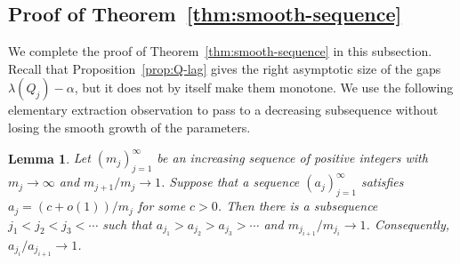 \documentclass[10pt]{article}
\numberwithin{equation}{section}
\newtheorem{lemma}[theorem]{Lemma}
\begin{document}
\subsection{Proof of Theorem~\ref{thm:smooth-sequence}}
%
We complete the proof of Theorem~\ref{thm:smooth-sequence} in this subsection. 
Recall that Proposition~\ref{prop:Q-lag} gives the right asymptotic size of the gaps $\lambda(Q_j)-\alpha$, but it does not by itself make them monotone. We use the following elementary extraction observation to pass to a decreasing subsequence without losing the smooth growth of the parameters.

\begin{lemma}\label{lem:extraction}
Let $(m_j)_{j=1}^\infty$ be an increasing sequence of positive integers with $m_j\to\infty$ and $m_{j+1}/m_j\to 1$. Suppose that a sequence $(a_j)_{j=1}^\infty$ satisfies $a_j=(c+o(1))/{m_j}$ for some $c>0$. Then there is a subsequence $j_1<j_2<j_3<\cdots$ such that $a_{j_1}>a_{j_2}>a_{j_3}>\cdots$ and ${m_{j_{i+1}}}/{m_{j_i}}\to 1$. 
Consequently, ${a_{j_i}}/{a_{j_{i+1}}}\to 1$.
\end{lemma}
\end{document}
